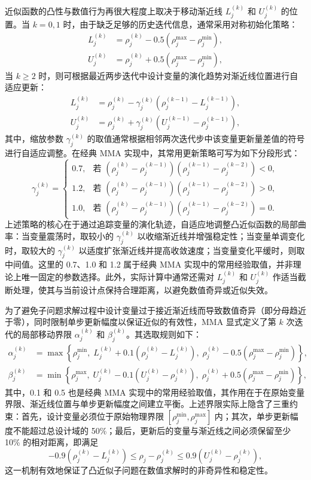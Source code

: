 近似函数的凸性与数值行为再很大程度上取决于移动渐近线 $L_j^{(k)}$ 和 $U_j^{(k)}$ 的位置。当 $k=0,1$ 时，由于缺乏足够的历史迭代信息，通常采用对称初始化策略：
\[
\begin{aligned} 
	L_j^{(k)} &= \rho_j^{(k)} - 0.5(\rho_j^{\max}-\rho_j^{\min}),\\ 
	U_j^{(k)} &= \rho_j^{(k)} + 0.5(\rho_j^{\max}-\rho_j^{\min}),
\end{aligned}
\]
当 $k\ge 2$ 时，则可根据最近两步迭代中设计变量的演化趋势对渐近线位置进行自适应更新：
\[
\begin{aligned} 
	L_j^{(k)} &= \rho_j^{(k)} - \gamma_j^{(k)}(\rho_j^{(k-1)}-L_j^{(k-1)}),\\ 
	U_j^{(k)} &= \rho_j^{(k)} + \gamma_j^{(k)}(U_j^{(k-1)}-\rho_j^{(k-1)}),
\end{aligned}
\]
其中，缩放参数 $\gamma_j^{(k)}$ 的取值通常根据相邻两次迭代步中该变量更新量差值的符号进行自适应调整。在经典 MMA 实现中，其常用更新策略可写为如下分段形式：
\[
\gamma_j^{(k)} = 
\begin{cases} 
	0.7, & \text{若 } (\rho_j^{(k)}-\rho_j^{(k-1)})(\rho_j^{(k-1)}-\rho_j^{(k-2)}) < 0, \\ 
	1.2, & \text{若 } (\rho_j^{(k)}-\rho_j^{(k-1)})(\rho_j^{(k-1)}-\rho_j^{(k-2)}) > 0, \\ 
	1.0, & \text{若 } (\rho_j^{(k)}-\rho_j^{(k-1)})(\rho_j^{(k-1)}-\rho_j^{(k-2)}) = 0.
\end{cases}
\]
上述策略的核心在于通过追踪变量的演化轨迹，自适应地调整凸近似函数的局部曲率：当变量震荡时，取较小的 $\gamma_j^{(k)}$ 以收缩渐近线并增强稳定性；当变量单调变化时，取较大的 $\gamma_j^{(k)}$ 以适度扩张渐近线并提高收敛速度；当变量变化平缓时，则取中间值。这里的 0.7、1.0 和 1.2 属于经典 MMA 实现中的常用经验取值，并非理论上唯一固定的参数选择。此外，实际计算中通常还需对 $L_j^{(k)}$ 和 $U_j^{(k)}$ 作适当截断处理，使其与当前设计点保持合理距离，以避免数值奇异或近似失效。

为了避免子问题求解过程中设计变量过于接近渐近线而导致数值奇异（即分母趋近于零），同时限制单步更新幅度以保证近似的有效性，MMA 显式定义了第 $k$ 次迭代的局部移动界限 $\alpha_j^{(k)}$ 和 $\beta_j^{(k)}$。其选取规则如下：
\[
\begin{aligned} 
	\alpha_j^{(k)} &= \max\left\{ \rho_j^{\min},\; L_j^{(k)} + 0.1(\rho_j^{(k)} - L_j^{(k)}),\; \rho_j^{(k)} - 0.5(\rho_j^{\max} - \rho_j^{\min}) \right\},\\ 
	\beta_j^{(k)} &= \min\left\{ \rho_j^{\max},\; U_j^{(k)} - 0.1(U_j^{(k)} - \rho_j^{(k)}),\; \rho_j^{(k)} + 0.5(\rho_j^{\max} - \rho_j^{\min}) \right\}, 
\end{aligned}
\]
其中，0.1 和 0.5 也是经典 MMA 实现中的常用经验取值，其作用在于在原始变量界限、渐近线位置与单步更新幅度之间建立平衡。上述界限实际上隐含了三重约束：首先，设计变量必须位于原始物理界限 $[\rho_j^{\min}, \rho_j^{\max}]$ 内；其次，单步更新幅度不能超过总设计域的 50\%；最后，更新后的变量与渐近线之间必须保留至少 10\% 的相对距离，即满足
\[
-0.9(\rho_j^{(k)} - L_j^{(k)}) \leq \rho_j - \rho_j^{(k)} \leq 0.9(U_j^{(k)} - \rho_j^{(k)}),
\]
这一机制有效地保证了凸近似子问题在数值求解时的非奇异性和稳定性。

